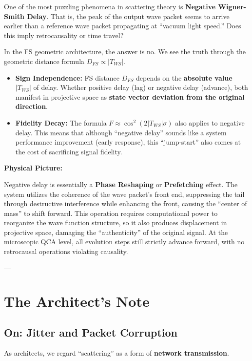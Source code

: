 \documentclass[11pt,a4paper,twoside]{book}
\begin{document}
One of the most puzzling phenomena in scattering theory is \textbf{Negative Wigner-Smith Delay}. That is, the peak of the output wave packet seems to arrive earlier than a reference wave packet propagating at ``vacuum light speed.'' Does this imply retrocausality or time travel?

In the FS geometric architecture, the answer is no. We see the truth through the geometric distance formula $D_{FS} \propto |T_{WS}|$.

\begin{itemize}
\item \textbf{Sign Independence:} FS distance $D_{FS}$ depends on the \textbf{absolute value} $|T_{WS}|$ of delay. Whether positive delay (lag) or negative delay (advance), both manifest in projective space as \textbf{state vector deviation from the original direction}.

\item \textbf{Fidelity Decay:} The formula $F \approx \cos^2(2 |T_{WS}| \sigma)$ also applies to negative delay. This means that although ``negative delay'' sounds like a system performance improvement (early response), this ``jump-start'' also comes at the cost of sacrificing signal fidelity.
\end{itemize}

\textbf{Physical Picture:}

Negative delay is essentially a \textbf{Phase Reshaping} or \textbf{Prefetching} effect. The system utilizes the coherence of the wave packet's front end, suppressing the tail through destructive interference while enhancing the front, causing the ``center of mass'' to shift forward. This operation requires computational power to reorganize the wave function structure, so it also produces displacement in projective space, damaging the ``authenticity'' of the original signal. At the microscopic QCA level, all evolution steps still strictly advance forward, with no retrocausal operations violating causality.

---

\section{The Architect's Note}

\subsection{On: Jitter and Packet Corruption}

As architects, we regard ``scattering'' as a form of \textbf{network transmission}.
\end{document}
